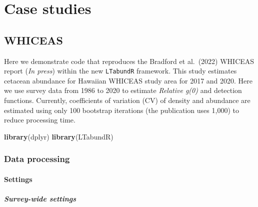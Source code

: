 \documentclass[
]{book}
\newenvironment{Shaded}{\begin{snugshade}}{\end{snugshade}}
\newcommand{\KeywordTok}[1]{\textcolor[rgb]{0.13,0.29,0.53}{\textbf{#1}}}
\newcommand{\NormalTok}[1]{#1}
\begin{document}
\hypertarget{part-case-studies}{%
\part{Case studies}\label{part-case-studies}}

\hypertarget{whiceas}{%
\chapter{WHICEAS}\label{whiceas}}

Here we demonstrate code that reproduces the Bradford et al.~(2022) WHICEAS report (\emph{In press}) within the new \texttt{LTabundR} framework. This study estimates cetacean abundance for Hawaiian WHICEAS study area for 2017 and 2020. Here we use survey data from 1986 to 2020 to estimate \emph{Relative g(0)} and detection functions. Currently, coefficients of variation (CV) of density and abundance are estimated using only 100 bootstrap iterations (the publication uses 1,000) to reduce processing time.

\begin{Shaded}
\begin{Highlighting}[]
\KeywordTok{library}\NormalTok{(dplyr)}
\KeywordTok{library}\NormalTok{(LTabundR)}
\end{Highlighting}
\end{Shaded}

\hypertarget{data-processing}{%
\section*{Data processing}\label{data-processing}}

\hypertarget{settings-1}{%
\subsection*{Settings}\label{settings-1}}

\hypertarget{survey-wide-settings-2}{%
\subsubsection*{Survey-wide settings}\label{survey-wide-settings-2}}
\end{document}
